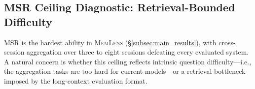 \documentclass{llmxive}
\providecommand{\bench}{\textsc{MemLens}}
\begin{document}






\subsection{MSR Ceiling Diagnostic: Retrieval-Bounded Difficulty}
\label{app:msr_ceiling}

MSR is the hardest ability in \bench{} (\S\ref{subsec:main_results}), with cross-session aggregation over three to eight sessions defeating every evaluated system. A natural concern is whether this ceiling reflects intrinsic question difficulty---i.e., the aggregation tasks are too hard for current models---or a retrieval bottleneck imposed by the long-context evaluation format.
\end{document}
